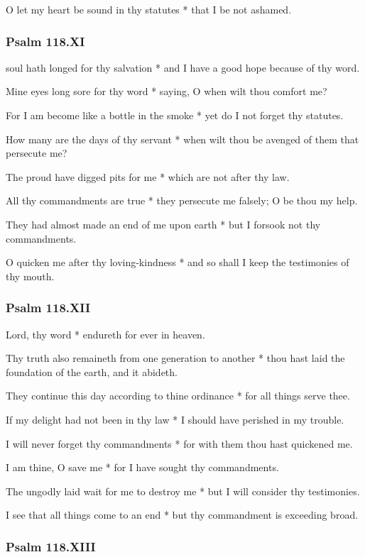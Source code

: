 O let my heart be sound in thy statutes * that I be not ashamed.

\subsubsection{Psalm 118.XI}

 soul hath longed for thy salvation * and I have a good hope because of thy word.

Mine eyes long sore for thy word * saying, O when wilt thou comfort me?

For I am become like a bottle in the smoke * yet do I not forget thy statutes.

How many are the days of thy servant * when wilt thou be avenged of them that persecute me?

The proud have digged pits for me * which are not after thy law.

All thy commandments are true * they persecute me falsely; O be thou my help.

They had almost made an end of me upon earth * but I forsook not thy commandments.

O quicken me after thy loving-kindness * and so shall I keep the testimonies of thy mouth.

\subsubsection{Psalm 118.XII}

 Lord, thy word * endureth for ever in heaven.

Thy truth also remaineth from one generation to another * thou hast laid the foundation of the earth, and it abideth.

They continue this day according to thine ordinance * for all things serve thee.

If my delight had not been in thy law * I should have perished in my trouble.

I will never forget thy commandments * for with them thou hast quickened me.

I am thine, O save me * for I have sought thy commandments.

The ungodly laid wait for me to destroy me * but I will consider thy testimonies.

I see that all things come to an end * but thy commandment is exceeding broad.

\subsubsection{Psalm 118.XIII}

